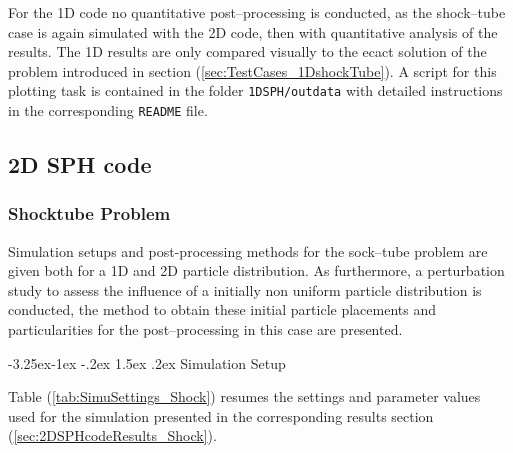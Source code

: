 \documentclass{report}
\makeatletter
\renewcommand\paragraph{\@startsection{paragraph}{4}{\z@}%
  {-3.25ex\@plus -1ex \@minus -.2ex}%
  {1.5ex \@plus .2ex}%
  {\normalfont\normalsize\bfseries}}
\makeatother
\begin{document}
For the 1D code no quantitative post--processing is conducted, as the shock--tube case is again simulated with the 2D code, then with quantitative analysis of the results. 
The 1D results are only compared visually to the ecact solution of the problem introduced in section (\ref{sec:TestCases_1DshockTube}). A script for this plotting task is contained in the folder {\tt 1DSPH/outdata} with detailed instructions in the corresponding {\tt README} file.



\subsection{2D SPH code}
\label{sec:2DSPHcodeGeneralTestCaseIntroduction}

\subsubsection{Shocktube Problem}
\label{sec:2Dshock_simuSetup&Co}
Simulation setups and post-processing methods for the sock--tube problem are given both for a 1D and 2D particle distribution. As furthermore, a perturbation study to assess the influence of a initially non uniform particle distribution is conducted, the method to obtain these initial particle placements and particularities for the post--processing in this case are presented. 

\paragraph{Simulation Setup}

Table (\ref{tab:SimuSettings_Shock}) resumes the settings and parameter values used for the simulation presented in the corresponding results section (\ref{sec:2DSPHcodeResults_Shock}). 
\end{document}
